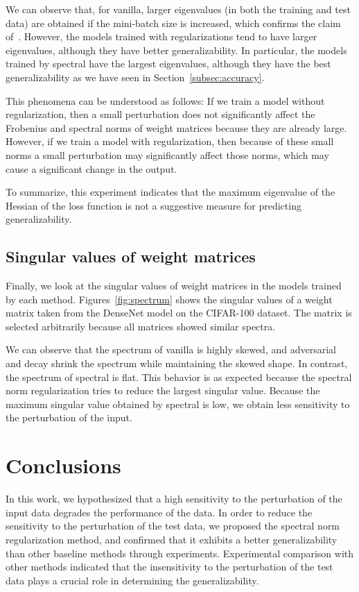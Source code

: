 We can observe that, for \textsf{vanilla}, larger eigenvalues (in both the training and test data) are obtained if the mini-batch size is increased, which confirms the claim of~\cite{Keskar:2017tz}. However, the models trained with regularizations tend to have larger eigenvalues, although they have better generalizability. In particular, the models trained by \textsf{spectral} have the largest eigenvalues, although they have the best generalizability as we have seen in Section~\ref{subsec:accuracy}.

This phenomena can be understood as follows: If we train a model without regularization, then a small perturbation does not significantly affect the Frobenius and spectral norms of weight matrices because they are already large. However, if we train a model with regularization, then because of these small norms a small perturbation may significantly affect those norms, which may cause a significant change in the output.

To summarize, this experiment indicates that the maximum eigenvalue of the Hessian of the loss function is not a suggestive measure for predicting generalizability.

\subsection{Singular values of weight matrices}

Finally, we look at the singular values of weight matrices in the models trained by each method.
Figures~\ref{fig:spectrum} shows the singular values of a weight matrix taken from the DenseNet model on the CIFAR-100 dataset. The matrix is selected arbitrarily because all matrices showed similar spectra.

We can observe that the spectrum of \textsf{vanilla} is highly skewed, and \textsf{adversarial} and \textsf{decay} shrink the spectrum while maintaining the skewed shape. In contrast, the spectrum of \textsf{spectral} is flat. This behavior is as expected because the spectral norm regularization tries to reduce the largest singular value. Because the maximum singular value obtained by \textsf{spectral} is low, we obtain less sensitivity to the perturbation of the input.

\section{Conclusions}\label{sec:conclusions}
In this work, we hypothesized that a high sensitivity to the perturbation of the input data degrades the performance of the data. In order to reduce the sensitivity to the perturbation of the test data, we proposed the spectral norm regularization method, and confirmed that it exhibits a better generalizability than other baseline methods through experiments. Experimental comparison with other methods indicated that the insensitivity to the perturbation of the test data plays a crucial role in determining the generalizability.


